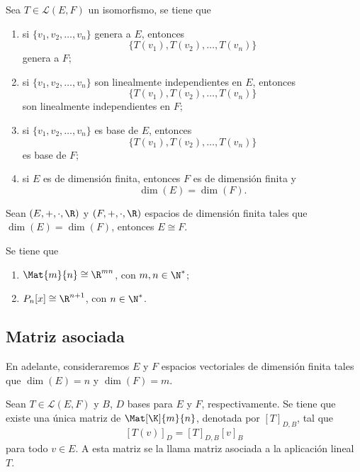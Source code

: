 \documentclass[a4,11pt]{aleph-notas}
\begin{document}
\begin{teo}
    Sea $T \in \mathcal{L}(E,F)$ un isomorfismo, se tiene que
    \begin{enumerate}
    \item 
        si $\{v_1, v_2, \ldots, v_n\}$ genera a $E$, entonces 
        \[
            \{T(v_1), T(v_2), \ldots, T(v_n)\}
        \]
        genera a $F$;
    \item 
        si $\{v_1, v_2, \ldots, v_n\}$ son linealmente independientes en $E$, entonces 
        \[
            \{T(v_1), T(v_2), \ldots, T(v_n)\}
        \] 
        son linealmente independientes en $F$;
    \item 
        si $\{v_1, v_2, \ldots, v_n\}$ es base de $E$, entonces
        \[
            \{T(v_1), T(v_2), \ldots, T(v_n)\}
        \]
        es base de $F$; 
    \item 
        si $E$ es de dimensión finita, entonces $F$ es de dimensión finita y 
        \[
            \dim(E) = \dim(F).
        \]
    \end{enumerate}
\end{teo} 

\begin{teo}
    Sean $(E,+,\cdot,\R)$ y $(F,+,\cdot,\R)$ espacios de dimensión finita tales que $\dim(E) = \dim(F)$, entonces $E \cong F$.
\end{teo}

\begin{teo}
    Se tiene que
    \begin{enumerate}
        \item $\Mat{m}{n} \cong \R^{mn}$, con $m,n\in\N^*$;
        \item $P_n[x] \cong \R^{n+1}$, con $n\in\N^*$.
    \end{enumerate}
\end{teo}


\subsection{Matriz asociada}

En adelante, consideraremos $E$ y $F$ espacios vectoriales de dimensión finita tales que $\dim(E)=n$ y $\dim(F)=m$.

\begin{defi}
    Sean $T \in \mathcal{L}(E,F)$ y $B$, $D$ bases para $E$ y $F$, respectivamente. Se tiene que existe una única matriz de $\Mat[\K]{m}{n}$, denotada por $[T]_{D,B}$, tal que
    \[
        [T(v)]_{D} = [T]_{D,B} [v]_{B}
    \]
    para todo $v\in E$. A esta matriz se la llama matriz asociada a la aplicación lineal $T$.
\end{defi}
\end{document}
